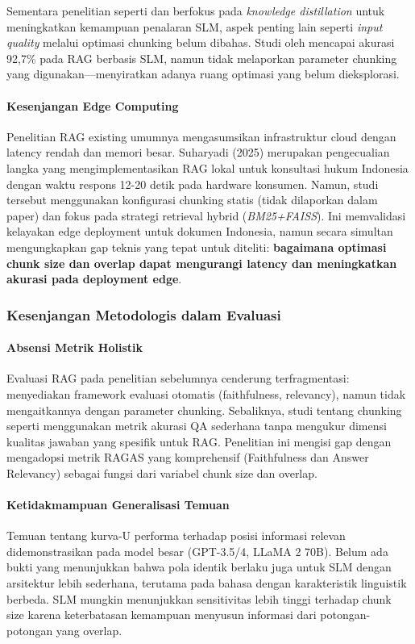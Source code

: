 Sementara penelitian seperti \cite{lee2024logic} dan \cite{wang2025reinforcement} berfokus pada \textit{knowledge distillation} untuk meningkatkan kemampuan penalaran SLM, aspek penting lain seperti \textit{input quality} melalui optimasi chunking belum dibahas. Studi oleh \cite{hong2025innovative} mencapai akurasi 92,7\% pada RAG berbasis SLM, namun tidak melaporkan parameter chunking yang digunakan—menyiratkan adanya ruang optimasi yang belum dieksplorasi.

\paragraph{Kesenjangan Edge Computing}
Penelitian RAG existing umumnya mengasumsikan infrastruktur cloud dengan latency rendah dan memori besar. Suharyadi (2025) \citep{suharyadi2025hybrid} merupakan pengecualian langka yang mengimplementasikan RAG lokal untuk konsultasi hukum Indonesia dengan waktu respons 12-20 detik pada hardware konsumen. Namun, studi tersebut menggunakan konfigurasi chunking statis (tidak dilaporkan dalam paper) dan fokus pada strategi retrieval hybrid (\textit{BM25+FAISS}). Ini memvalidasi kelayakan edge deployment untuk dokumen Indonesia, namun secara simultan mengungkapkan gap teknis yang tepat untuk diteliti: \textbf{bagaimana optimasi chunk size dan overlap dapat mengurangi latency dan meningkatkan akurasi pada deployment edge}.

\subsubsection{Kesenjangan Metodologis dalam Evaluasi}

\paragraph{Absensi Metrik Holistik}
Evaluasi RAG pada penelitian sebelumnya cenderung terfragmentasi: \cite{es2024ragas} menyediakan framework evaluasi otomatis (faithfulness, relevancy), namun tidak mengaitkannya dengan parameter chunking. Sebaliknya, studi tentang chunking seperti \cite{Liu2023LostIT} menggunakan metrik akurasi QA sederhana tanpa mengukur dimensi kualitas jawaban yang spesifik untuk RAG. Penelitian ini mengisi gap dengan mengadopsi metrik RAGAS yang komprehensif (Faithfulness dan Answer Relevancy) sebagai fungsi dari variabel chunk size dan overlap.

\paragraph{Ketidakmampuan Generalisasi Temuan}
Temuan \cite{Liu2023LostIT} tentang kurva-U performa terhadap posisi informasi relevan didemonstrasikan pada model besar (GPT-3.5/4, LLaMA 2 70B). Belum ada bukti yang menunjukkan bahwa pola identik berlaku juga untuk SLM dengan arsitektur lebih sederhana, terutama pada bahasa dengan karakteristik linguistik berbeda. SLM mungkin menunjukkan sensitivitas lebih tinggi terhadap chunk size karena keterbatasan kemampuan menyusun informasi dari potongan-potongan yang overlap.

